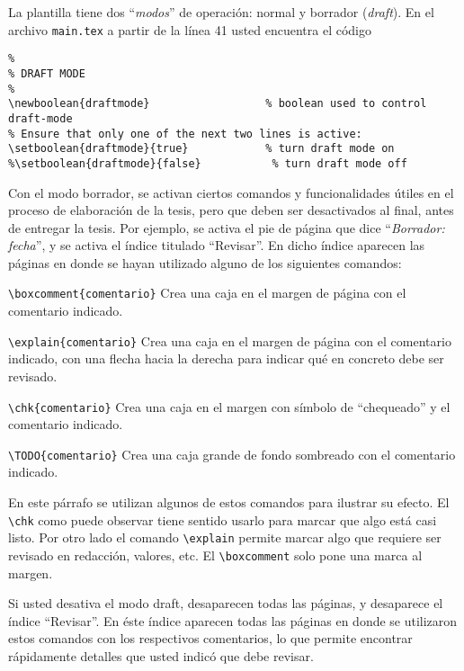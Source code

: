 La plantilla tiene dos ``\emph{modos}'' de operación: normal y borrador
(\emph{draft}).  En el archivo \texttt{main.tex} a partir de la línea 41 usted
encuentra el código

\begin{verbatim}
%
% DRAFT MODE
%
\newboolean{draftmode}                  % boolean used to control draft-mode
% Ensure that only one of the next two lines is active:
\setboolean{draftmode}{true}            % turn draft mode on
%\setboolean{draftmode}{false}           % turn draft mode off
\end{verbatim}

Con el modo borrador, se activan ciertos comandos y funcionalidades útiles en
el proceso de elaboración de la tesis, pero que deben ser desactivados al
final, antes de entregar la tesis.  Por ejemplo, se activa el pie de página que
dice ``\emph{Borrador: fecha}'', y se activa el índice titulado ``Revisar''.  En dicho índice aparecen las páginas en donde se hayan utilizado alguno de los siguientes comandos:
\begin{compactitem}
\item \verb+\boxcomment{comentario}+ Crea una caja en el margen de página con
  el comentario indicado.
\item \verb+\explain{comentario}+ Crea una caja en el margen de página con
  el comentario indicado, con una flecha hacia la derecha para indicar qué en
  concreto debe ser revisado.
\item \verb+\chk{comentario}+ Crea una caja en el margen con símbolo de
  ``chequeado'' y el comentario indicado.
\item \verb+\TODO{comentario}+ Crea una caja grande de fondo sombreado con el
  comentario indicado.
\end{compactitem}

En este párrafo se utilizan algunos de estos comandos
para ilustrar su efecto.  El \verb+\chk+ como puede observar tiene sentido
usarlo para marcar que algo está casi listo.  Por otro lado 
el comando \verb+\explain+ permite marcar algo que requiere ser revisado en
redacción, valores, etc.  El \verb+\boxcomment+
solo pone una marca al margen.


Si usted desativa el modo draft, desaparecen todas las páginas, y desaparece el
índice ``Revisar''.  En éste índice aparecen todas las páginas en donde se
utilizaron estos comandos con los respectivos comentarios, lo que permite
encontrar rápidamente detalles que usted indicó que debe revisar.

